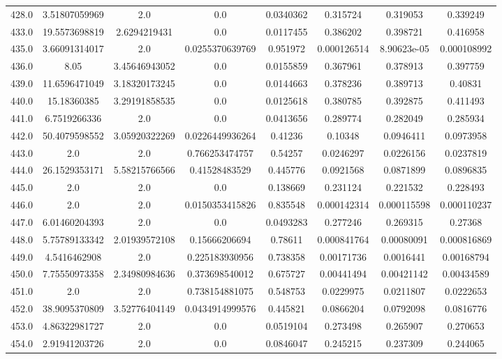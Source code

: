 \begin{longtable}{|c|c|c|c|c|c|c|c|}
428.0 & 3.51807059969 & 2.0 & 0.0 & 0.0340362 & 0.315724 & 0.319053 & 0.339249 \\
433.0 & 19.5573698819 & 2.6294219431 & 0.0 & 0.0117455 & 0.386202 & 0.398721 & 0.416958 \\
435.0 & 3.66091314017 & 2.0 & 0.0255370639769 & 0.951972 & 0.000126514 & 8.90623e-05 & 0.000108992 \\
436.0 & 8.05 & 3.45646943052 & 0.0 & 0.0155859 & 0.367961 & 0.378913 & 0.397759 \\
439.0 & 11.6596471049 & 3.18320173245 & 0.0 & 0.0144663 & 0.378236 & 0.389713 & 0.40831 \\
440.0 & 15.18360385 & 3.29191858535 & 0.0 & 0.0125618 & 0.380785 & 0.392875 & 0.411493 \\
441.0 & 6.7519266336 & 2.0 & 0.0 & 0.0413656 & 0.289774 & 0.282049 & 0.285934 \\
442.0 & 50.4079598552 & 3.05920322269 & 0.0226449936264 & 0.41236 & 0.10348 & 0.0946411 & 0.0973958 \\
443.0 & 2.0 & 2.0 & 0.766253474757 & 0.54257 & 0.0246297 & 0.0226156 & 0.0237819 \\
444.0 & 26.1529353171 & 5.58215766566 & 0.41528483529 & 0.445776 & 0.0921568 & 0.0871899 & 0.0896835 \\
445.0 & 2.0 & 2.0 & 0.0 & 0.138669 & 0.231124 & 0.221532 & 0.228493 \\
446.0 & 2.0 & 2.0 & 0.0150353415826 & 0.835548 & 0.000142314 & 0.000115598 & 0.000110237 \\
447.0 & 6.01460204393 & 2.0 & 0.0 & 0.0493283 & 0.277246 & 0.269315 & 0.27368 \\
448.0 & 5.75789133342 & 2.01939572108 & 0.15666206694 & 0.78611 & 0.000841764 & 0.00080091 & 0.000816869 \\
449.0 & 4.5416462908 & 2.0 & 0.225183930956 & 0.738358 & 0.00171736 & 0.0016441 & 0.00168794 \\
450.0 & 7.75550973358 & 2.34980984636 & 0.373698540012 & 0.675727 & 0.00441494 & 0.00421142 & 0.00434589 \\
451.0 & 2.0 & 2.0 & 0.738154881075 & 0.548753 & 0.0229975 & 0.0211807 & 0.0222653 \\
452.0 & 38.9095370809 & 3.52776404149 & 0.0434914999576 & 0.445821 & 0.0866204 & 0.0792098 & 0.0816776 \\
453.0 & 4.86322981727 & 2.0 & 0.0 & 0.0519104 & 0.273498 & 0.265907 & 0.270653 \\
454.0 & 2.91941203726 & 2.0 & 0.0 & 0.0846047 & 0.245215 & 0.237309 & 0.244065 \\

\end{longtable}
